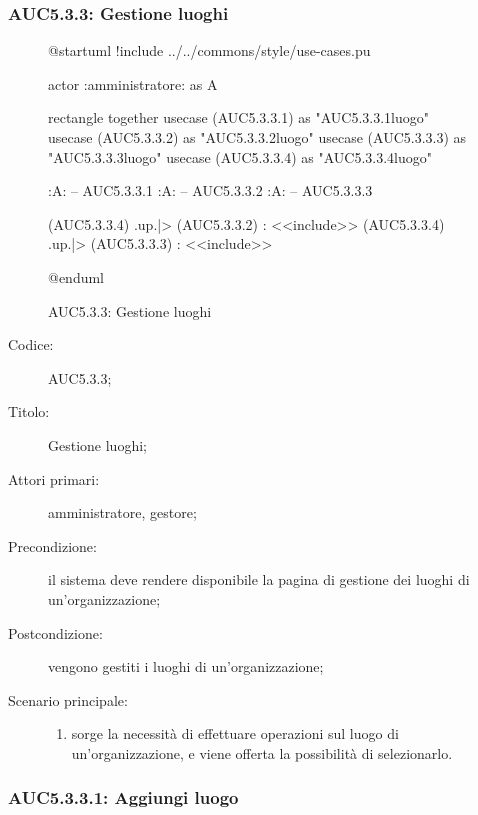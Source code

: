 
\subsubsection{AUC5.3.3: Gestione luoghi}%
\label{subs:AUC5.3.3}

\begin{figure}[H]
  \centering
  \begin{plantuml}
  @startuml
  !include ../../commons/style/use-cases.pu

  actor :amministratore: as A

  rectangle {
    together {
      usecase (AUC5.3.3.1) as "AUC5.3.3.1\nAggiungi luogo"
      usecase (AUC5.3.3.2) as "AUC5.3.3.2\nEliminazione luogo"
      usecase (AUC5.3.3.3) as "AUC5.3.3.3\nModifica luogo"
    }
    usecase (AUC5.3.3.4) as "AUC5.3.3.4\nSeleziona luogo"
  }

  :A: -- AUC5.3.3.1
  :A: -- AUC5.3.3.2
  :A: -- AUC5.3.3.3

  (AUC5.3.3.4) .up.|> (AUC5.3.3.2) : <<include>>
  (AUC5.3.3.4) .up.|> (AUC5.3.3.3) : <<include>>

  @enduml
  \end{plantuml}
  \caption{AUC5.3.3: Gestione luoghi}%
  \label{fig:AUC5_3_3}
\end{figure}

\begin{description}
  \item[Codice:] AUC5.3.3;
  \item[Titolo:] Gestione luoghi;
  \item[Attori primari:] amministratore, gestore;
  \item[Precondizione:] il sistema deve rendere disponibile la pagina di gestione dei luoghi di un'organizzazione;
  \item[Postcondizione:] vengono gestiti i luoghi di un'organizzazione;
  \item[Scenario principale:]
  \begin{enumerate}
    \item sorge la necessità di effettuare operazioni sul luogo di un'organizzazione, e viene offerta la possibilità di selezionarlo.
  \end{enumerate}
\end{description}

\subsubsection{AUC5.3.3.1: Aggiungi luogo}%
\label{subs:AUC5.3.3.1}

